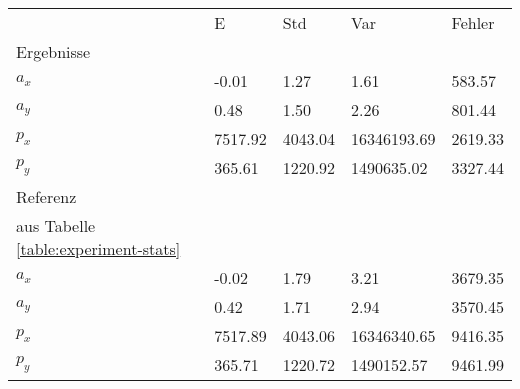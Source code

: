 \begin{tabular}{l|l|l|l|l}

     & E   & Std    & Var    & Fehler \\
\hhline{=|=|=|=|=}

Ergebnisse & & & & \\
$a_x$  &        -0.01 &         1.27 &         1.61 &       583.57 \\
$a_y$  &         0.48 &         1.50 &         2.26 &       801.44 \\
$p_x$  &      7517.92 &      4043.04 &  16346193.69 &      2619.33 \\
$p_y$  &       365.61 &      1220.92 &   1490635.02 &      3327.44 \\

\hline
Referenz & & & & \\
aus Tabelle  \ref{table:experiment-stats} & & & & \\
$a_x$  &        -0.02 &         1.79 &         3.21 &      3679.35 \\
$a_y$  &         0.42 &         1.71 &         2.94 &      3570.45 \\
$p_x$  &      7517.89 &      4043.06 &  16346340.65 &      9416.35 \\
$p_y$  &       365.71 &      1220.72 &   1490152.57 &      9461.99 \\
\end{tabular}
